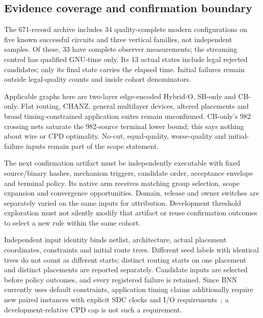 \documentclass[conference,10pt]{IEEEtran}
\begin{document}
\subsection{Evidence coverage and confirmation boundary}
The 671-record archive includes 34 quality-complete modern configurations on five known successful circuits and three vertical families, not independent samples. Of these, 33 have complete observer measurements; the streaming control has qualified GNU-time only. Its 13 actual states include legal rejected candidates; only its final state carries the elapsed time. Initial failures remain outside legal-quality counts and inside cohort denominators.

Applicable graphs here are two-layer edge-encoded Hybrid-O, SB-only and CB-only. Flat routing, CHANZ, general multilayer devices, altered placements and broad timing-constrained application suites remain unconfirmed. CB-only's 982 crossing nets saturate the 982-source terminal lower bound; this says nothing about wire or CPD optimality. No-cut, equal-quality, worse-quality and initial-failure inputs remain part of the scope statement.

The next confirmation artifact must be independently executable with fixed source/binary hashes, mechanism triggers, candidate order, acceptance envelope and terminal policy. Its native arm receives matching group selection, scope expansion and convergence opportunities. Domain, release and owner switches are separately varied on the same inputs for attribution. Development threshold exploration must not silently modify that artifact or reuse confirmation outcomes to select a new rule within the same cohort.

Independent input identity binds netlist, architecture, actual placement coordinates, constraints and initial route trees. Different seed labels with identical trees do not count as different starts; distinct routing starts on one placement and distinct placements are reported separately. Candidate inputs are selected before policy outcomes, and every registered failure is retained. Since BNN currently uses default constraints, application timing claims additionally require new paired instances with explicit SDC clocks and I/O requirements~\cite{vprsdc}; a development-relative CPD cap is not such a requirement.
\end{document}
